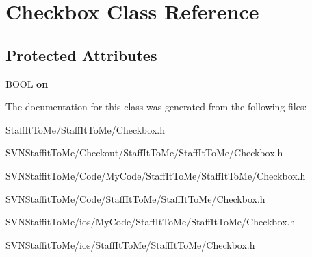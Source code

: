 \hypertarget{interface_checkbox}{
\section{\-Checkbox \-Class \-Reference}
\label{interface_checkbox}
}
\subsection*{\-Protected \-Attributes}
\begin{DoxyCompactItemize}
\item 
\hypertarget{interface_checkbox_a7387e385481e9c1a22036c3f1f1e2872}{
\-B\-O\-O\-L {\bfseries on}}
\label{interface_checkbox_a7387e385481e9c1a22036c3f1f1e2872}

\end{DoxyCompactItemize}


\-The documentation for this class was generated from the following files\-:\begin{DoxyCompactItemize}
\item 
\-Staff\-It\-To\-Me/\-Staff\-It\-To\-Me/\-Checkbox.\-h\item 
\-S\-V\-N\-Staffit\-To\-Me/\-Checkout/\-Staff\-It\-To\-Me/\-Staff\-It\-To\-Me/\-Checkbox.\-h\item 
\-S\-V\-N\-Staffit\-To\-Me/\-Code/\-My\-Code/\-Staff\-It\-To\-Me/\-Staff\-It\-To\-Me/\-Checkbox.\-h\item 
\-S\-V\-N\-Staffit\-To\-Me/\-Code/\-Staff\-It\-To\-Me/\-Staff\-It\-To\-Me/\-Checkbox.\-h\item 
\-S\-V\-N\-Staffit\-To\-Me/ios/\-My\-Code/\-Staff\-It\-To\-Me/\-Staff\-It\-To\-Me/\-Checkbox.\-h\item 
\-S\-V\-N\-Staffit\-To\-Me/ios/\-Staff\-It\-To\-Me/\-Staff\-It\-To\-Me/\-Checkbox.\-h\end{DoxyCompactItemize}
